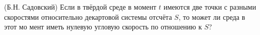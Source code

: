 (Б.Н. Садовский)
Если в твёрдой среде в момент $t$ имеются две точки с разными скоростями
относительно декартовой системы отсчёта $S$, то может ли среда в этот мо
мент иметь нулевую угловую скорость по отношению к $S$?
